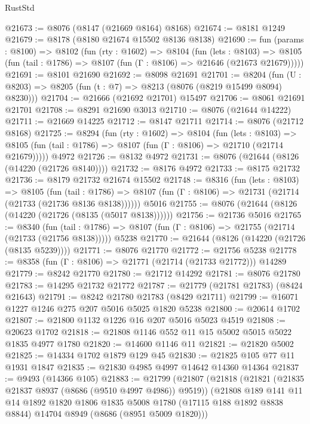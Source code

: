 \begin{lexlean}{RustStd}
\begin{coremodule}
@21673 := @8076 (@8147 (@21669 @8164) @8168)
@21674 := @8181 @1249
@21679 := @8178 (@8180 @21674 @15502 @8136 @8138)
@21690 := fun (params : @8100) =>
  @8102
    (fun (rty : @1602) =>
    @8104
      (fun (lets : @8103) =>
      @8105 (fun (tail : @1786) => @8107 (fun (Γ : @8106) => @21646 (@21673 @21679)))))
@21691 := @8101 @21690
@21692 := @8098 @21691
@21701 := @8204
    (fun (U : @8203) => @8205 (fun (t : @7) => @8213 (@8076 (@8219 @15499 @8094) @8230)))
@21704 := @21666 (@21692 @21701) @15497
@21706 := @8061 @21691 @21701
@21708 := @8291 @21690 @3013
@21710 := @8076 (@21644 @14222)
@21711 := @21669 @14225
@21712 := @8147 @21711
@21714 := @8076 (@21712 @8168)
@21725 := @8294
    (fun (rty : @1602) =>
    @8104
      (fun (lets : @8103) =>
      @8105 (fun (tail : @1786) => @8107 (fun (Γ : @8106) => @21710 (@21714 @21679)))))
    @4972
@21726 := @8132 @4972
@21731 := @8076 (@21644 (@8126 (@14220 (@21726 @8140))))
@21732 := @8176 @4972
@21733 := @8175 @21732
@21736 := @8179 @21732 @21674 @15502
@21748 := @8316
    (fun (lets : @8103) =>
    @8105
      (fun (tail : @1786) =>
      @8107 (fun (Γ : @8106) => @21731 (@21714 (@21733 (@21736 @8136 @8138))))))
    @5016
@21755 := @8076 (@21644 (@8126 (@14220 (@21726 (@8135 (@5017 @8138))))))
@21756 := @21736 @5016
@21765 := @8340
    (fun (tail : @1786) => @8107 (fun (Γ : @8106) => @21755 (@21714 (@21733 (@21756 @8138)))))
    @5238
@21770 := @21644 (@8126 (@14220 (@21726 (@8135 @5239))))
@21771 := @8076 @21770
@21772 := @21756 @5238
@21778 := @8358 (fun (Γ : @8106) => @21771 (@21714 (@21733 @21772))) @14289
@21779 := @8242 @21770
@21780 := @21712 @14292
@21781 := @8076 @21780
@21783 := @14295 @21732 @21772
@21787 := @21779 (@21781 @21783) (@8424 @21643)
@21791 := @8242 @21780 @21783 (@8429 @21711)
@21799 := @16071 @1227 @1246 @275 @207 @5016 @5025 @1820 @5238
@21800 := @20614 @1702
@21807 := @21800 @1132 @1226 @16 @207 @5016 @5023 @4519
@21808 := @20623 @1702
@21818 := @21808 @1146 @552 @11 @15 @5002 @5015 @5022 @1835 @4977 @1780
@21820 := @14600 @1146 @11
@21821 := @21820 @5002
@21825 := @14334 @1702 @1879 @129 @45
@21830 := @21825 @105 @77 @11 @1931 @1847
@21835 := @21830 @4985 @4997 @14642 @14360 @14364
@21837 := @9493 (@14366 @105)
@21883 := @21799
    (@21807
      (@21818
        (@21821 (@21835 @21837 @8937 (@8686 (@9510 @4997 @4986)) @9519))
        (@21808
          @189
          @141
          @11
          @14
          @1892
          @1820
          @1806
          @1835
          @5008
          @1780
          (@17115 @188 @1892 @8838 @8844)
          @14704
          @8949
          (@8686 (@8951 @5009 @1820)))

\end{coremodule}
\end{lexlean}
